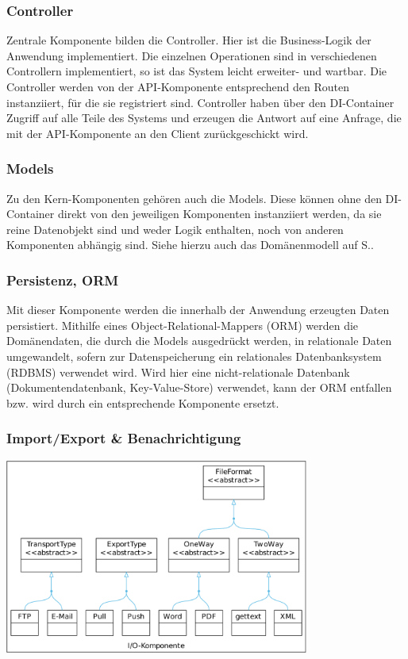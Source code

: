 \subsubsection{Controller}

Zentrale Komponente bilden die Controller. Hier ist die Business-Logik der Anwendung implementiert. Die einzelnen Operationen sind in verschiedenen Controllern implementiert, so ist das System leicht erweiter- und wartbar. Die Controller werden von der API-Komponente entsprechend den Routen instanziiert, für die sie registriert sind. Controller haben über den DI-Container Zugriff auf alle Teile des Systems und erzeugen die Antwort auf eine Anfrage, die mit der API-Komponente an den Client zurückgeschickt wird.

\subsubsection{Models}

Zu den Kern-Komponenten gehören auch die Models. Diese können ohne den DI-Container direkt von den jeweiligen Komponenten instanziiert werden, da sie reine Datenobjekt sind und weder Logik enthalten, noch von anderen Komponenten abhängig sind. Siehe hierzu auch das Domänenmodell auf S.\pageref{l:domänenmodell}.

\subsubsection{Persistenz, ORM}

Mit dieser Komponente werden die innerhalb der Anwendung erzeugten Daten persistiert. Mithilfe eines Object-Relational-Mappers (ORM) werden die Domänendaten, die durch die Models ausgedrückt werden, in relationale Daten umgewandelt, sofern zur Datenspeicherung ein relationales Datenbanksystem (RDBMS) verwendet wird. Wird hier eine nicht-relationale Datenbank (Dokumentendatenbank, Key-Value-Store) verwendet, kann der ORM entfallen bzw. wird durch ein entsprechende Komponente ersetzt.

\subsubsection{Import/Export \& Benachrichtigung}

\begin{center}
\includegraphics[width=0.75\textwidth]{media/io.pdf}
\label{chart:io}
\end{center}

